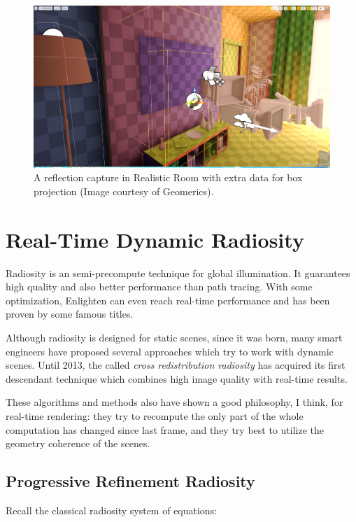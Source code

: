 \begin{figure}
	\includegraphics[width=1.0\textwidth]{graphics/gi/path-28}
	\caption{A reflection capture in Realistic Room with extra data for box projection (Image courtesy of Geomerics).}
\end{figure}





\section{Real-Time Dynamic Radiosity}\label{sec:dynamic-radiosity}
Radiosity is an semi-precompute technique for global illumination. It guarantees high quality and also better performance than path tracing. With some optimization, Enlighten can even reach real-time performance and has been proven  by some famous titles. 

Although radiosity is designed for static scenes, since it was born, many smart engineers have proposed several approaches which try to work with dynamic scenes. Until 2013, the called \textit{cross redistribution radiosity} has acquired its first descendant technique which combines high image quality with real-time results. 

These algorithms and methods also have shown a good philosophy, I think, for real-time rendering: they try to recompute the only part of the whole computation has changed since last frame, and they try best to utilize the geometry coherence of the scenes.




\subsection{Progressive Refinement Radiosity}
Recall the classical radiosity system of equations:

